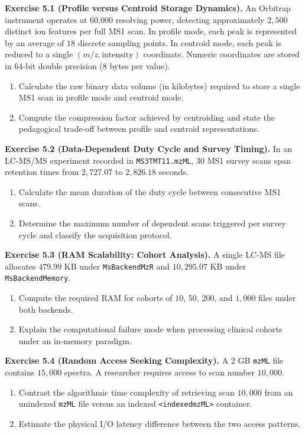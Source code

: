 \documentclass[11pt,twoside,openright]{book}
\begin{document}
\noindent\textbf{Exercise 5.1 (Profile versus Centroid Storage Dynamics).}\enspace
\label{ex:profile_centroid_storage}
An Orbitrap instrument operates at 60,000 resolving power, detecting approximately $2,500$ distinct ion features per full MS1 scan. In profile mode, each peak is represented by an average of $18$ discrete sampling points. In centroid mode, each peak is reduced to a single $(m/z, \text{intensity})$ coordinate. Numeric coordinates are stored in 64-bit double precision ($8$ bytes per value).
\begin{enumerate}
    \item Calculate the raw binary data volume (in kilobytes) required to store a single MS1 scan in profile mode and centroid mode.
    \item Compute the compression factor achieved by centroiding and state the pedagogical trade-off between profile and centroid representations.
\end{enumerate}

\vspace{0.8em}
\noindent\textbf{Exercise 5.2 (Data-Dependent Duty Cycle and Survey Timing).}\enspace
\label{ex:dda_duty_cycle}
In an LC-MS/MS experiment recorded in \texttt{MS3TMT11.mzML}, 30 MS1 survey scans span retention times from $2,727.07$ to $2,826.18$ seconds.
\begin{enumerate}
    \item Calculate the mean duration of the duty cycle between consecutive MS1 scans.
    \item Determine the maximum number of dependent scans triggered per survey cycle and classify the acquisition protocol.
\end{enumerate}

\vspace{0.8em}
\noindent\textbf{Exercise 5.3 (RAM Scalability: Cohort Analysis).}\enspace
\label{ex:cohort_scalability}
A single LC-MS file allocates $479.99$ KB under \texttt{MsBackendMzR} and $10,295.07$ KB under \texttt{MsBackendMemory}.
\begin{enumerate}
    \item Compute the required RAM for cohorts of $10$, $50$, $200$, and $1,000$ files under both backends.
    \item Explain the computational failure mode when processing clinical cohorts under an in-memory paradigm.
\end{enumerate}

\vspace{0.8em}
\noindent\textbf{Exercise 5.4 (Random Access Seeking Complexity).}\enspace
\label{ex:random_access_complexity}
A 2 GB \texttt{mzML} file contains $15,000$ spectra. A researcher requires access to scan number $10,000$.
\begin{enumerate}
    \item Contrast the algorithmic time complexity of retrieving scan $10,000$ from an unindexed \texttt{mzML} file versus an indexed \texttt{<indexedmzML>} container.
    \item Estimate the physical I/O latency difference between the two access patterns.
\end{enumerate}
\end{document}
